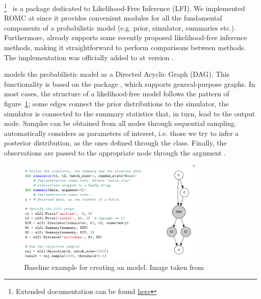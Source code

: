 \footnote{Extended
  documentation can be found
  \href{https://elfi.readthedocs.io/en/latest/}{here}}~\cite{1708.00707}
is a  package dedicated to Likelihood-Free Inference
(LFI). We implemented ROMC at  since it provides convenient
modules for all the fundamental components of a probabilistic model
(e.g. prior, simulator, summaries etc.). Furthermore, 
already supports some recently proposed likelihood-free inference
methods, making it straightforward to perform comparisons between
methods. The implementation was officially added to  at
version .


 models the probabilistic model as a Directed Acyclic Graph
(DAG). This functionality is based on the package ,
which supports general-purpose graphs. In most cases, the structure of
a likelihood-free model follows the pattern of figure~\ref{fig:elfi};
some edges connect the prior distributions to the simulator, the
simulator is connected to the summary statistics that, in turn, lead
to the output node. Samples can be obtained from all nodes through
sequential sampling.  automatically considers as parameters
of interest, i.e. those we try to infer a posterior distribution,
as the ones  defined through the  class. Finally, the
observations are passed to the appropriate node through the argument
.

\begin{figure}[h]
    \begin{center}
      \includegraphics[width=0.8\textwidth]{./latex_files/images/chapter2/elfi.png}
    \end{center}
    \caption[Baseline example for creating an  model]{Baseline example for creating an  model. Image taken from \cite{1708.00707}}
    \label{fig:elfi}
\end{figure}

